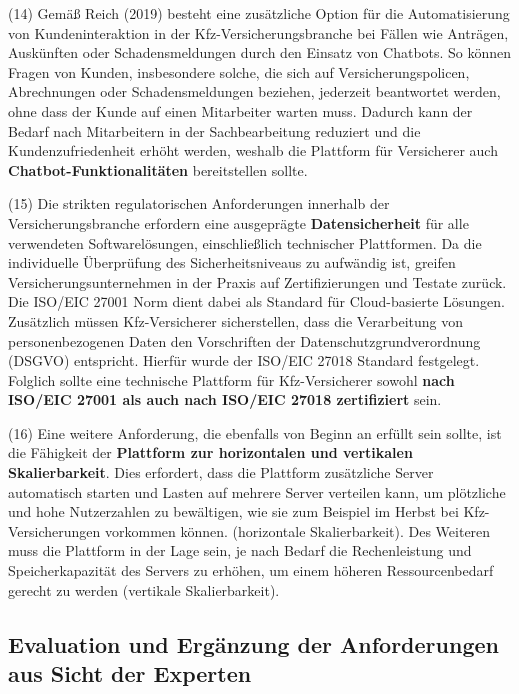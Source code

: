 (14) Gemäß Reich (2019) besteht eine zusätzliche Option für die Automatisierung von Kundeninteraktion in der Kfz-Versicherungsbranche bei Fällen wie Anträgen, Auskünften oder Schadensmeldungen durch den Einsatz von Chatbots. So können Fragen von Kunden, insbesondere solche, die sich auf Versicherungspolicen, Abrechnungen oder Schadensmeldungen beziehen, jederzeit beantwortet werden, ohne dass der Kunde auf einen Mitarbeiter warten muss. Dadurch kann der Bedarf nach Mitarbeitern in der Sachbearbeitung reduziert und die Kundenzufriedenheit erhöht werden, weshalb die Plattform für Versicherer auch \textbf{Chatbot-Funktionalitäten} bereitstellen sollte. \autocite[Vgl.][S. 300-302]{REICH2019}

(15) Die strikten regulatorischen Anforderungen innerhalb der Versicherungsbranche erfordern eine ausgeprägte \textbf{Datensicherheit} für alle verwendeten Softwarelösungen, einschließlich technischer Plattformen. Da die individuelle Überprüfung des Sicherheitsniveaus zu aufwändig ist, greifen Versicherungsunternehmen in der Praxis auf Zertifizierungen und Testate zurück. \autocite[Vgl.][S. 777]{ZDANOWIECKI2016} Die ISO/EIC 27001 Norm dient dabei als Standard für Cloud-basierte Lösungen. Zusätzlich müssen Kfz-Versicherer sicherstellen, dass die Verarbeitung von personenbezogenen Daten den Vorschriften der Datenschutzgrundverordnung (DSGVO) entspricht. Hierfür wurde der ISO/EIC 27018 Standard festgelegt. Folglich sollte eine technische Plattform für Kfz-Versicherer sowohl \textbf{nach ISO/EIC 27001 als auch nach ISO/EIC 27018 zertifiziert} sein. 

(16) Eine weitere Anforderung, die ebenfalls von Beginn an erfüllt sein sollte, ist die Fähigkeit der \textbf{Plattform zur horizontalen und vertikalen Skalierbarkeit}. Dies erfordert, dass die Plattform zusätzliche Server automatisch starten und Lasten auf mehrere Server verteilen kann, um plötzliche und hohe Nutzerzahlen zu bewältigen, wie sie zum Beispiel im Herbst bei Kfz-Versicherungen vorkommen können. (horizontale Skalierbarkeit). Des Weiteren muss die Plattform in der Lage sein, je nach Bedarf die Rechenleistung und Speicherkapazität des Servers zu erhöhen, um einem höheren Ressourcenbedarf gerecht zu werden (vertikale Skalierbarkeit). \autocite[Vgl.][S. 23]{JAHNERT2020}

\subsection{Evaluation und Ergänzung der Anforderungen aus Sicht der Experten}


